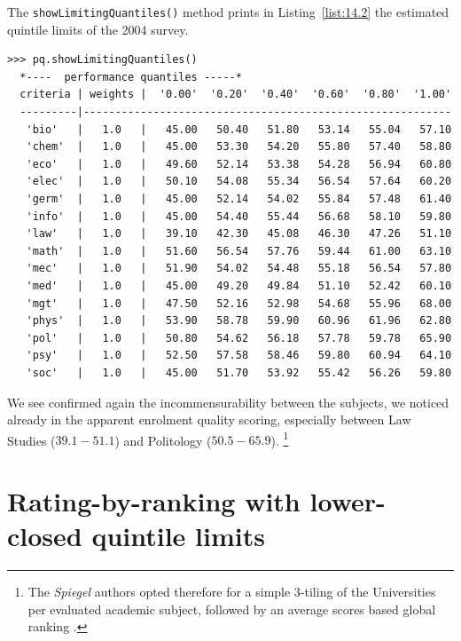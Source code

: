 The \texttt{showLimitingQuantiles()} method prints in Listing~\vref{list:14.2} the estimated quintile limits of the 2004 survey.
\begin{lstlisting}[caption={Estimated quintile limits of the 2004 survey},label=list:14.2,basicstyle=\ttfamily\scriptsize]
>>> pq.showLimitingQuantiles()
  *----  performance quantiles -----*
  criteria | weights |  '0.00'  '0.20'  '0.40'  '0.60'  '0.80'  '1.00'   
  ---------|----------------------------------------------------------
   'bio'   |   1.0   |   45.00   50.40   51.80   53.14   55.04   57.10  
   'chem'  |   1.0   |   45.00   53.30   54.20   55.80   57.40   58.80  
   'eco'   |   1.0   |   49.60   52.14   53.38   54.28   56.94   60.80  
   'elec'  |   1.0   |   50.10   54.08   55.34   56.54   57.64   60.20  
   'germ'  |   1.0   |   45.00   52.14   54.02   55.84   57.48   61.40  
   'info'  |   1.0   |   45.00   54.40   55.44   56.68   58.10   59.80  
   'law'   |   1.0   |   39.10   42.30   45.08   46.30   47.26   51.10  
   'math'  |   1.0   |   51.60   56.54   57.76   59.44   61.00   63.10  
   'mec'   |   1.0   |   51.90   54.02   54.48   55.18   56.54   57.80  
   'med'   |   1.0   |   45.00   49.20   49.84   51.10   52.42   60.10  
   'mgt'   |   1.0   |   47.50   52.16   52.98   54.68   55.96   68.00  
   'phys'  |   1.0   |   53.90   58.78   59.90   60.96   61.96   62.80  
   'pol'   |   1.0   |   50.80   54.62   56.18   57.78   59.78   65.90  
   'psy'   |   1.0   |   52.50   57.58   58.46   59.80   60.94   64.10  
   'soc'   |   1.0   |   45.00   51.70   53.92   55.42   56.26   59.80  
\end{lstlisting}
                     
We see confirmed again the incommensurability between the subjects, we noticed already in the apparent enrolment quality scoring, especially between Law Studies ($39.1 - 51.1$) and Politology ($50.5 - 65.9$). \footnote{The \emph{Spiegel} authors opted therefore for a simple 3-tiling of the Universities per evaluated academic subject, followed by an average \Borda scores based global ranking \citep{SPI-2004}.}


\section{Rating-by-ranking with lower-closed quintile limits}
\label{sec:14.3}


